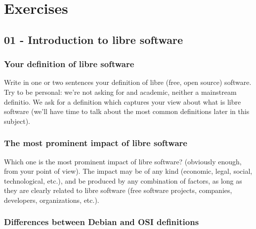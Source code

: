 \documentclass[a4paper]{article}
\begin{document}
\section{Exercises}

\subsection{01 - Introduction to libre software}


\subsubsection{Your definition of libre software}
\label{exe:definition-libresoftware}

Write in one or two sentences your definition of libre (free, open source) software. Try to be personal: we're not asking for and academic, neither a mainstream definitio. We ask for a definition which captures your view about what is libre software (we'll have time to talk about the most common definitions later in this subject). 

\subsubsection{The most prominent impact of libre software}
\label{exe:impact-libresoftware}

Which one is the most prominent impact of libre software? (obviously enough, from your point of view). The impact may be of any kind (economic, legal, social, technological, etc.), and be produced by any combination of factors, as long as they are clearly related to libre software (free software projects, companies, developers, organizations, etc.).

\subsubsection{Differences between Debian and OSI definitions}
\label{exe:debian-osi-differences}
\end{document}

